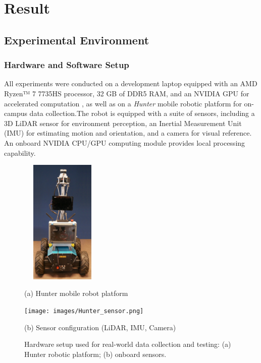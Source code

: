 \chapter{Result}
\label{ch:intro}

\section{Experimental Environment}

\subsection{Hardware and Software Setup}
All experiments were conducted on a development laptop equipped with an AMD Ryzen™ 7 7735HS processor, 32 GB of DDR5 RAM, and an NVIDIA GPU for accelerated computation , as well as on a \emph{Hunter} mobile robotic platform for on-campus data collection.The robot is equipped with a suite of sensors, including a 3D LiDAR sensor for environment perception, an Inertial Measurement Unit (IMU) for estimating motion and orientation, and a camera for visual reference. An onboard NVIDIA CPU/GPU computing module provides local processing capability.

\begin{figure}[H]
	\centering
	\begin{minipage}{0.5\textwidth}
		\centering
		\includegraphics[height=6cm , width=4cm]{images/Hunter_body.png}
		\caption*{(a) Hunter mobile robot platform}
	\end{minipage}\hfill
	\begin{minipage}{0.5\textwidth}
		\centering
		\texttt{[image: images/Hunter\_sensor.png]}
		\caption*{(b) Sensor configuration (LiDAR, IMU, Camera)}
	\end{minipage}
	\caption{Hardware setup used for real-world data collection and testing: (a) Hunter robotic platform; (b) onboard sensors.}
	\label{fig:hunter-robot-setup}
\end{figure}

